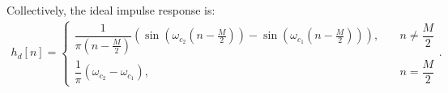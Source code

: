 Collectively, the ideal impulse response is:
\begin{align*}
h_d[n] = \begin{cases}
\dfrac{1}{\pi \left( n - \frac{M}{2}\right)} \left( \sin\left( \omega_{c_2} \left( n - \frac{M}{2} \right) \right) - \sin \left( \omega_{c_1} \left( n - \frac{M}{2} \right) \right) \right), \quad &n \neq \dfrac{M}{2} \\
\dfrac{1}{\pi} ( \omega_{c_2} - \omega_{c_1}), \quad &n = \dfrac{M}{2}
\end{cases}.
\end{align*}

\clearpage

\clearpage